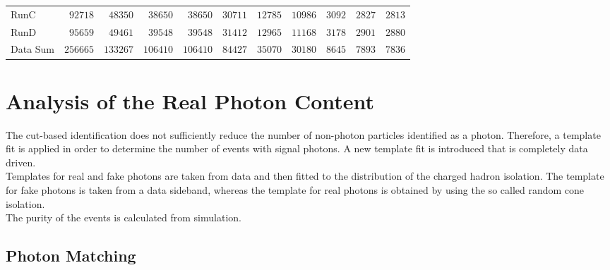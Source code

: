 \begin{landscape}
\begin{table}
\begin{tabular}{l | r r r r r r r r r r }
             RunC &$             92718 $&$             48350 $&$             38650 $&$             38650 $&$             30711 $&$             12785 $&$             10986 $&$              3092 $&$              2827 $&$              2813 $ \\

             RunD &$             95659 $&$             49461 $&$             39548 $&$             39548 $&$             31412 $&$             12965 $&$             11168 $&$              3178 $&$              2901 $&$              2880 $ \\

\hline

         Data Sum &$            256665 $&$            133267 $&$            106410 $&$            106410 $&$             84427 $&$             35070 $&$             30180 $&$              8645 $&$              7893 $&$              7836 $ \\

\hline

\end{tabular}
\label{tab_ttg_sel_evt}
\end{table}
\end{landscape}

\section{Analysis of the Real Photon Content}

The cut-based identification does not sufficiently reduce the number of non-photon particles identified as a photon. Therefore, a template fit is applied in order to determine the number of events with signal photons. A new template fit is introduced that is completely data driven. \\
Templates for real and fake photons are taken from data and then fitted to the distribution of the charged hadron isolation. The template for fake photons is taken from a data sideband, whereas the template for real photons is obtained by using the so called random cone isolation.\\
The purity of the \ttgamma events is calculated from simulation.\\

\subsection{Photon Matching}

